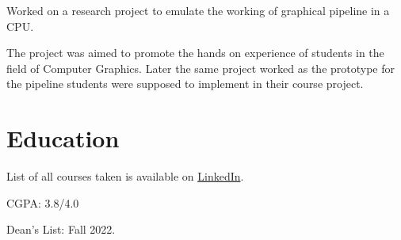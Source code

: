 \documentclass[]{resume}
\begin{document}
\begin{minipage}[t]{0.5\textwidth}
    \begin{tightemize}
        \sectionsep
        \item Worked on a research project to emulate the working of graphical pipeline in a CPU.
        \item The project was aimed to promote the hands on experience of students in the field of Computer Graphics. Later the same project worked as the prototype for the pipeline students were supposed to implement in their course project.
    \end{tightemize}


    \section{Education}
     
    \begin{tightemize}
        \sectionsep
        \item List of all courses taken is available on \href{https://www.linkedin.com/in/meesumaliqazalbash/details/courses/}{LinkedIn}.
        \item CGPA: 3.8/4.0
        \item Dean's List: Fall 2022.
    \end{tightemize}


\end{minipage}
\end{document}
